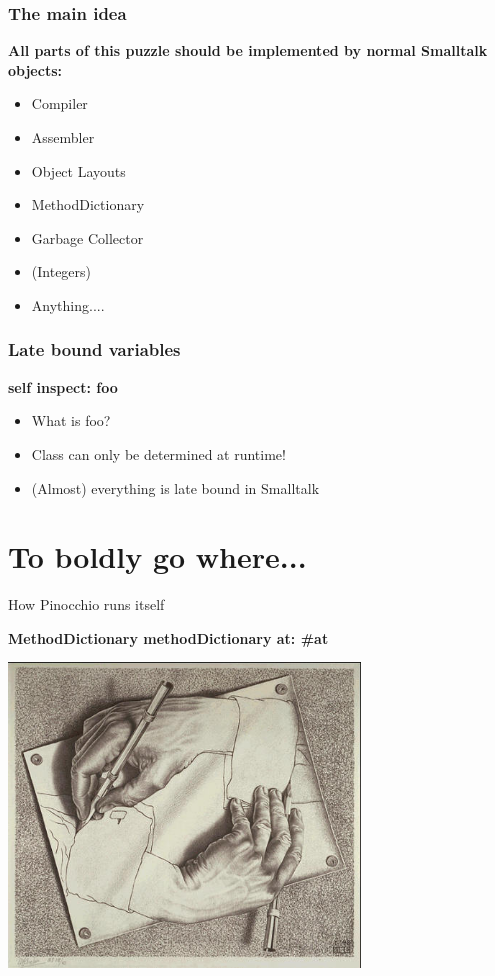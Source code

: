 \documentclass{beamer}
\begin{document}
\begin{frame}[fragile]
    \frametitle{The main idea}
    {\bf All parts of this puzzle should be implemented by normal Smalltalk objects: }
    \begin{itemize}
        \item Compiler
        \item Assembler
        \item Object Layouts
        \item MethodDictionary
        \item Garbage Collector
        \item (Integers)
        \item Anything.... 
    \end{itemize}
\end{frame}

\begin{frame}[fragile]
    \frametitle{Late bound variables}
    {\bf self inspect: foo }
    \begin{itemize}
        \item What is foo?
        \item Class can only be determined at runtime! 
        \item (Almost) everything is late bound in Smalltalk
    \end{itemize}
\end{frame}

\section{To boldly go where...}

\begin{frame}{How Pinocchio runs itself}

    {\bf MethodDictionary methodDictionary at: \#at}

    \begin{center}\includegraphics[width=0.7\textwidth]{escher.jpg}\end{center}
\end{frame}
\end{document}
